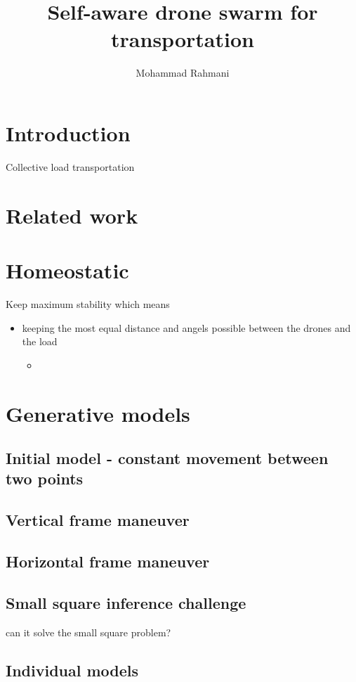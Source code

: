 \documentclass{article}
\begin{document}
	
	\title{Self-aware drone swarm for transportation}
	\author{Mohammad Rahmani}
	\date{}
	\maketitle
	\section{Introduction}
	Collective load transportation
	
	\section{Related work}
	
	\section{Homeostatic}
	Keep maximum stability which means 
		\begin{itemize}
			\item keeping the most equal distance and angels possible between the drones and the load
				\begin{itemize}
					\item 
				\end{itemize}
		\end{itemize}
		
	\section{Generative models}
		\subsection{Initial model - constant movement between two points}
		\subsection{Vertical frame maneuver}
		\subsection{Horizontal frame maneuver}
		\subsection{Small square inference challenge} can it solve the small square problem?
		
		\subsection{Individual models}
\end{document}

